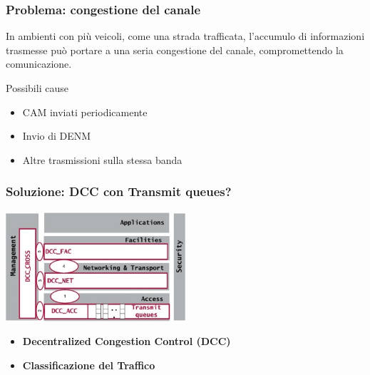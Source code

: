 \documentclass{beamer}
\begin{document}
\begin{frame}
    \frametitle{Problema: congestione del canale}
    In ambienti con più veicoli, come una strada trafficata, l'accumulo di informazioni trasmesse può portare a una \alert{seria congestione del canale}, compromettendo la comunicazione.
    \vfill
    \begin{block}{Possibili cause}
        \begin{itemize}
            \vspace{5pt}
            \item {CAM inviati periodicamente}
            \vspace{5pt}
            \item {Invio di DENM}
            \vspace{5pt}
            \item {Altre trasmissioni sulla stessa banda}
            \vspace{5pt}
        \end{itemize}
    \end{block}
    
\end{frame}

\begin{frame}
    \frametitle{Soluzione: DCC con Transmit queues?}
    \centering
    \vfill
    \includegraphics[width=0.5\textwidth]{dcc_edca.jpg}
    \vfill
    \begin{itemize}
        \item \textbf{Decentralized Congestion Control (DCC)}
        \vspace{15pt}
        \item \textbf{Classificazione del Traffico}
    \end{itemize}
    \vfill
\end{frame}
\end{document}
